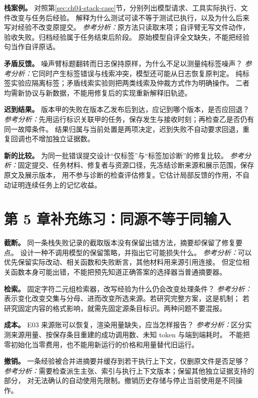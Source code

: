 \textbf{栈案例。} 对照第\ref{sec:ch04-stack-case}节，分别列出模型请求、工具实际执行、文件改变与任务后经验。
解释为什么测试可读不等于测试已执行，以及为什么后来写对经验不改变原提交。
\emph{参考分析：}原方法只读取末项；自评臂无写文件动作，验收失败。归档经验属于任务结束后阶段。
原始模型自评全文缺失，不能把经验句当作自评原话。

\textbf{矛盾反馈。} 噪声臂标题翻转而日志保持原样，为什么不足以测量纯标签噪声？
\emph{参考分析：}它同时产生标签错误与线索冲突，模型还可能从日志恢复原判定。
纯标签实验应隔离标签；矛盾线索实验则把两类线索及仲裁方式作为明确操作。
二者均需新协议与新数据，不能用修复后的实现重新解释旧轨迹。

\textbf{迟到结果。} 版本甲的失败在版本乙发布后到达，应记到哪个版本，是否应回退？
\emph{参考分析：}先用运行标识关联甲的任务，保存发生与接收时刻；再检查乙是否仍有同一故障条件。
结果归属与当前处置是两项决定，迟到失败不自动要求回退，重复回调也不增加独立证据数。

\textbf{新的比较。} 为同一批错误提交设计“仅标签”与“标签加诊断”的修复比较。
\emph{参考分析：}固定提交、任务材料、修复者与资源口径，先冻结诊断来源和展示范围，保存原文及展示版本，
用不参与诊断的检查评估修复。它估计局部反馈的作用，不自动证明连续任务上的记忆收益。

\section{第 5 章补充练习：同源不等于同输入}

\textbf{截断。} 同一条栈失败记录的截取版本没有保留出错方法，摘要却保留了修复要点。
设计一种不调用模型的保留策略，并指出它可能损失什么。
\emph{参考分析：}可以优先保留实际改动、相关函数和失败断言，其他材料用来源引用连接。
但定位相关函数本身可能出错，不能把预先知道正确答案的选择器当普通摘要器。

\textbf{检索。} 固定字符二元组检索器，改写经验为什么仍会改变处理条件？
\emph{参考分析：}表示变化改变交集与分母、进而改变所选来源。若研究完整方案，这是机制；
若研究固定内容的格式影响，就需先固定源条目标识。两种问题不要混报。

\textbf{成本。} E03 来源账可以恢复，渲染用量缺失，应当怎样报告？
\emph{参考分析：}区分实测来源用量、按保存条目重建的成功调用数、未知 token 与端到端耗时。
不能把零初始化当零费用，也不能用新运行的价格和用量替代旧运行。

\textbf{撤销。} 一条经验被合并进摘要并缓存到若干执行上下文，仅删原文件是否足够？
\emph{参考分析：}需要检查派生主张、索引与执行上下文版本；保留其他独立证据支持的部分，
对无法确认的自动使用先限制。撤销历史存储与停止当前使用是不同操作。

